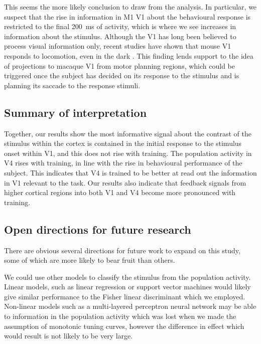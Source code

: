 This seems the more likely conclusion to draw from the analysis.
In particular, we suspect that the rise in information in \ac{M1} \ac{V1} about the behavioural response is restricted to the final \SI{200}{\milli\second} of activity, which is where we see increases in information about the stimulus.
Although the \acl{V1} has long been believed to process visual information only, recent studies have shown that mouse \ac{V1} responds to locomotion, even in the dark \citep{Pakan2016,Saleem2013,Keller2012}.
This finding lends support to the idea of projections to macaque \ac{V1} from motor planning regions, which could be triggered once the subject has decided on its response to the stimulus and is planning its saccade to the response stimuli.


\subsection{Summary of interpretation}

Together, our results show the most informative signal about the contrast of the stimulus within the cortex is contained in the initial response to the stimulus onset within \ac{V1}, and this does not rise with training.
The population activity in \ac{V4} rises with training, in line with the rise in behavioural performance of the subject.
This indicates that \ac{V4} is trained to be better at read out the information in \ac{V1} relevant to the task.
Our results also indicate that feedback signals from higher cortical regions into both \ac{V1} and \ac{V4} become more pronounced with training.


\subsection{Open directions for future research}

There are obvious several directions for future work to expand on this study, some of which are more likely to bear fruit than others.

We could use other models to classify the stimulus from the population activity.
Linear models, such as linear regression or support vector machines would likely give similar performance to the Fisher linear discriminant which we employed.
Non-linear models such as a multi-layered perceptron neural network may be able to information in the population activity which was lost when we made the assumption of monotonic tuning curves, however the difference in effect which would result is not likely to be very large.

